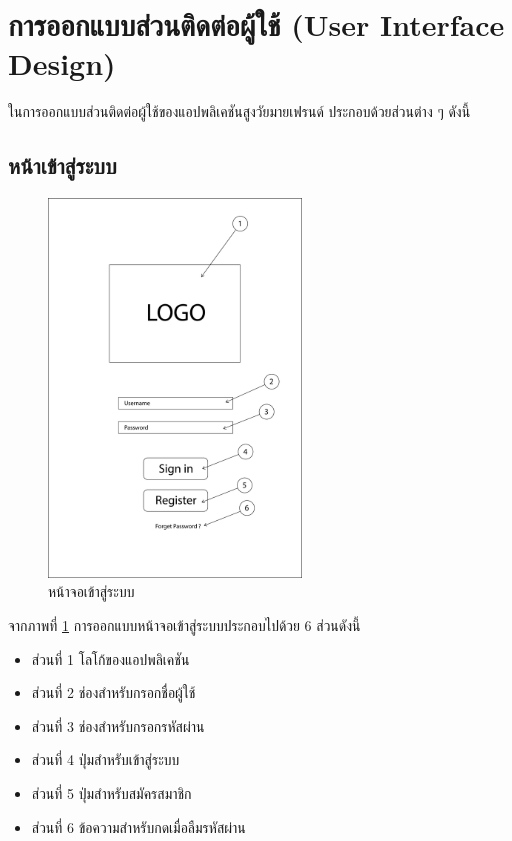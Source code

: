 
\section{การออกแบบส่วนติดต่อผู้ใช้ (User Interface Design)}
ในการออกแบบส่วนติดต่อผู้ใช้ของแอปพลิเคชันสูงวัยมายเฟรนด์ ประกอบด้วยส่วนต่าง ๆ ดังนี้
	\subsection{หน้าเข้าสู่ระบบ}
		\begin{figure}[H]
			\centering
			\includegraphics[width=0.6\textwidth]{Figures/3/UI/login}
			\caption{หน้าจอเข้าสู่ระบบ}
			\label{Fig:หน้าจอเข้าสู่ระบบ}
		\end{figure}
		จากภาพที่ \ref{Fig:หน้าจอเข้าสู่ระบบ} การออกแบบหน้าจอเข้าสู่ระบบประกอบไปด้วย 6 ส่วนดังนี้
		\begin{itemize}
			\item ส่วนที่ 1 โลโก้ของแอปพลิเคชัน
			\item ส่วนที่ 2 ช่องสำหรับกรอกชื่อผู้ใช้
			\item ส่วนที่ 3 ช่องสำหรับกรอกรหัสผ่าน
			\item ส่วนที่ 4 ปุ่มสำหรับเข้าสู่ระบบ
			\item ส่วนที่ 5 ปุ่มสำหรับสมัครสมาชิก
			\item ส่วนที่ 6 ข้อความสำหรับกดเมื่อลืมรหัสผ่าน
		\end{itemize}

